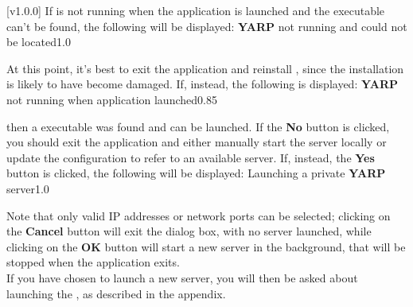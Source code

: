 [v1.0.0]
If \yarp{} is not running when the \emph{\CMU} application is launched and the \yarp{}
executable can't be found, the following will be displayed:
%
{\textbf{YARP} not running and could not be located}{1.0}

At this point, it's best to exit the \emph{\CMU} application and reinstall \mplusm, since
the installation is likely to have become damaged.
If, instead, the following is displayed:
%
{\textbf{YARP} not running when application launched}{0.85}

then a \yarp{} executable was found and can be launched.
If the \textbf{No} button is clicked, you should exit the \emph{\CMU} application and
either manually start the \yarp{} server locally or update the \yarp{} configuration to
refer to an available \yarp{} server.
\condPage{}
If, instead, the \textbf{Yes} button is clicked, the following will be displayed:
%
{Launching a private \textbf{YARP} server}{1.0}

Note that only valid IP addresses or network ports can be selected; clicking on the
\textbf{Cancel} button will exit the dialog box, with no \yarp{} server launched, while
clicking on the \textbf{OK} button will start a new \yarp{} server in the background, that
will be stopped when the \emph{\CMU} application exits.\\

If you have chosen to launch a new \yarp{} server, you will then be asked about launching
the \emph{\RS}, as described in the  appendix.
\appendixEnd{}
